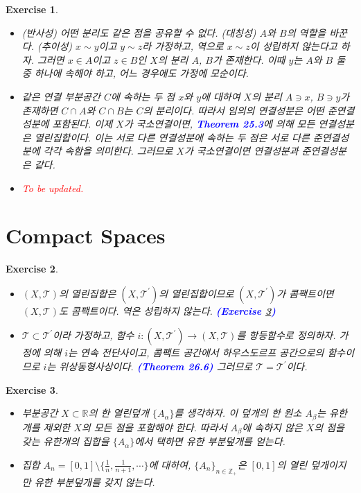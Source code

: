 \documentclass{article}
\newtheorem{exercise}{Exercise}[section]
\newcommand{\R}{\mathbb{R}}
\newcommand{\Z}{\mathbb{Z}}
\begin{document}
\begin{exercise}
    \phantom{}
    \begin{itemize}
        \item[(a)] (반사성) 어떤 분리도 같은 점을 공유할 수 없다. (대칭성) $A$와 $B$의 역할을 바꾼다. (추이성) $x\sim y$이고 $y\sim z$라 가정하고, 역으로 $x\sim z$이 성립하지 않는다고 하자. 그러면 $x\in A$이고 $z\in B$인 $X$의 분리 $A$, $B$가 존재한다. 이때 $y$는 $A$와 $B$ 둘 중 하나에 속해야 하고, 어느 경우에도 가정에 모순이다.
        \item[(b)] 같은 연결 부분공간 $C$에 속하는 두 점 $x$와 $y$에 대하여 $X$의 분리 $A\ni x$, $B\ni y$가 존재하면 $C\cap A$와 $C\cap B$는 $C$의 분리이다. 따라서 임의의 연결성분은 어떤 준연결성분에 포함된다. 이제 $X$가 국소연결이면, \textcolor{blue}{\textbf{Theorem 25.3}}에 의해 모든 연결성분은 열린집합이다. 이는 서로 다른 연결성분에 속하는 두 점은 서로 다른 준연결성분에 각각 속함을 의미한다. 그러므로 $X$가 국소연결이면 연결성분과 준연결성분은 같다.
        \item[(c)] \textcolor{red}{To be updated.}
    \end{itemize}
\end{exercise}

\section{Compact Spaces}

\begin{exercise}
    \phantom{}
    \begin{itemize}
        \item[(a)] $(X,\mathcal{T})$의 열린집합은 $(X,\mathcal{T}^\prime)$의 열린집합이므로 $(X,\mathcal{T}^\prime)$가 콤팩트이면 $(X,\mathcal{T})$도 콤팩트이다. 역은 성립하지 않는다. \textcolor{blue}{\textbf{(Exercise \ref{exc:26.2})}}
        \item[(b)] $\mathcal{T}\subset\mathcal{T}^\prime$이라 가정하고, 함수 $i:(X,\mathcal{T}^\prime)\to(X,\mathcal{T})$를 항등함수로 정의하자. 가정에 의해 $i$는 연속 전단사이고, 콤팩트 공간에서 하우스도르프 공간으로의 함수이므로 $i$는 위상동형사상이다. \textcolor{blue}{\textbf{(Theorem 26.6)}} 그러므로 $\mathcal{T}=\mathcal{T}^\prime$이다.
    \end{itemize}
\end{exercise}

\begin{exercise}
	\label{exc:26.2}
    \phantom{}
    \begin{itemize}
        \item[(a)] 부분공간 $X\subset\R$의 한 열린덮개 $\{A_\alpha\}$를 생각하자. 이 덮개의 한 원소 $A_\beta$는 유한개를 제외한 $X$의 모든 점을 포함해야 한다. 따라서 $A_\beta$에 속하지 않은 $X$의 점을 갖는 유한개의 집합을 $\{A_\alpha\}$에서 택하면 유한 부분덮개를 얻는다.
        \item[(b)] 집합 $A_n=[0,1]\setminus\{\frac{1}{n},\frac{1}{n+1},\cdots\}$에 대하여, $\{A_n\}_{n\in\Z_+}$은 $[0,1]$의 열린 덮개이지만 유한 부분덮개를 갖지 않는다.
    \end{itemize}
\end{exercise}
\end{document}
